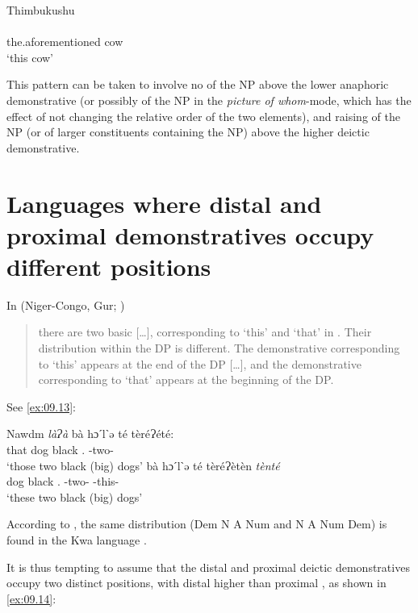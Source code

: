 \documentclass[output=paper]{langsci/langscibook}
\begin{document}
\ea Thimbukushu \parencite[50]{Fisch1998}\\\label{ex:09.12}
	\\
		    {} the.aforementioned cow\\
	\glt ‘this cow’
\z

This pattern can be taken to involve no  of the NP above the lower
anaphoric demonstrative (or possibly  of the NP in the
\emph{picture of whom}-mode, which has the effect of not changing the relative
order of the two elements), and raising of the NP (or of larger constituents
containing the NP) above the higher deictic demonstrative.

\section{Languages where distal and proximal demonstratives occupy different
positions}

In  (Niger-Congo, Gur; \citealt[§2.4]{Albro1998})

\begin{quote}there are
    two basic  [\dots{}], corresponding to \enquote*{this} and
    \enquote*{that} in . Their distribution within the DP is different.
    The demonstrative corresponding to \enquote*{this} appears at the end of
    the DP [\dots{}], and the demonstrative corresponding to \enquote*{that}
appears at the beginning of the DP.
\end{quote}

\noindent See \eqref{ex:09.13}:\largerpage[1]

\ea Nawdm \parencite[6]{Albro1998}\label{ex:09.13}
	\ea
		\gll \textit{làɁà} bà  hɔˊlˋə  té  tèréɁété:\\
			that dog black \Cl.\Pl{} \Cl{}-two-\Cl{}\\
		\glt ‘those two black (big) dogs’
	\ex
		\gll bà hɔˊlˋə té tèréɁètèn \textit{tènté}\\
			dog black \Cl.\Pl{} \Cl{}-two-\Cl{} {\Cl{}-this-\Cl{}}\\
		\glt ‘these two black (big) dogs’
	\z
\z

According to \textcite[66ff]{Apronti1971}, the same distribution (Dem
N A Num and N A Num Dem) is found in the Kwa language
.

It is thus tempting to assume that the distal and proximal deictic
demonstratives occupy two distinct  positions, with distal 
higher than proximal , as shown in \eqref{ex:09.14}:
\end{document}
